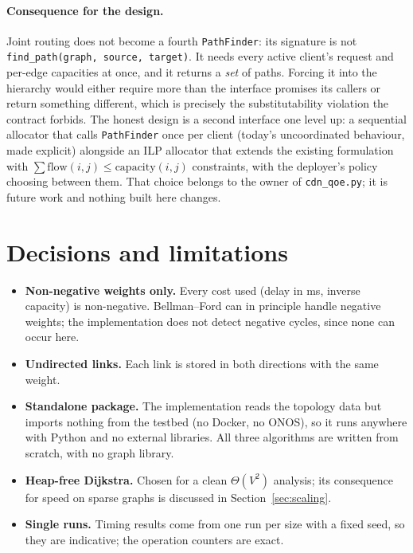 \documentclass[11pt,a4paper]{article}
\begin{document}
\paragraph{Consequence for the design.}
Joint routing does not become a fourth \texttt{PathFinder}: its signature is not \texttt{find\_path(graph, source, target)}. It needs every
active client's request and per-edge capacities at once, and it returns a \emph{set} of paths. Forcing it into the hierarchy would
either require more than the interface promises its callers or return something different, which is precisely the substitutability
violation the contract forbids. The honest design is a second interface one level up: a sequential allocator that calls \texttt{PathFinder}
once per client (today's uncoordinated behaviour, made explicit) alongside an ILP allocator that extends the existing formulation with
$\sum \text{flow}(i,j)\le \text{capacity}(i,j)$ constraints, with the deployer's policy choosing between them. That choice belongs to the owner of
\texttt{cdn\_qoe.py}; it is future work and nothing built here changes.

\section{Decisions and limitations}
\label{sec:decisions}

\begin{itemize}
  \item \textbf{Non-negative weights only.} Every cost used (delay in ms, inverse capacity) is non-negative. Bellman--Ford can in principle
        handle negative weights; the implementation does not detect negative cycles, since none can occur here.
  \item \textbf{Undirected links.} Each link is stored in both directions with the same weight.
  \item \textbf{Standalone package.} The implementation reads the topology data but imports nothing from the testbed (no Docker, no ONOS),
        so it runs anywhere with Python and no external libraries. All three algorithms are written from scratch, with no graph library.
  \item \textbf{Heap-free Dijkstra.} Chosen for a clean $\Theta(V^2)$ analysis; its consequence for speed on sparse graphs is discussed in
        Section~\ref{sec:scaling}.
  \item \textbf{Single runs.} Timing results come from one run per size with a fixed seed, so they are indicative; the operation counters are exact.
\end{itemize}
\end{document}
